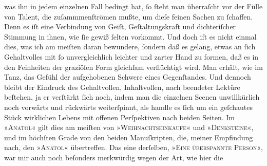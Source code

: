 \begin{ledgroupsized}[t]{13cm}
                    was ihn in jedem einzelnen Fall bedingt hat, ſo ſteht man überraſcht vor der
                    Fülle von Talent, die zuſammmenſtrömen mußte, um dieſe feinen Sachen zu
                    ſchaffen. Denn es iſt eine Verbindung von Geiſt, Geſtaltungskraft und
                    dichteriſcher Stimmung in ihnen, wie ſie gewiß ſelten vorkommt. Und doch iſt es
                    nicht einmal dies, was ich am meiſten {\pb}daran bewundere, ſondern daß es gelang, etwas an ſich Gehaltvolles mit ſo
                    unvergleichlich leichter und zarter Hand zu formen, daß es in den Feinheiten der
                    graziöſen Form gleichſam verflüchtigt wird. Man erhält, wie im Tanz, das Gefühl
                    der aufgehobenen Schwere eines Gegenſtandes. Und dennoch bleibt der Eindruck des
                    Gehaltvollen, Inhaltvollen, nach beendeter Lektüre beſtehen, ja er verſtärkt
                    ſich noch, indem man die einzelnen Scenen unwillkürlich noch vorwärts und
                    rückwärts weiterſpinnt, als handle es ſich um ein geſchautes Stück wirklichen
                    Lebens mit offenen Perſpektiven nach beiden Seiten. Im »\textsc{Anatol}« gilt dies am meiſten von »\textsc{Weihnachtseinkäufe}« und »\textsc{Denksteine}«, und im höchſten Grade von den beiden Manuſkripten, die, meiner
                    Empfindung nach, den »\textsc{Anatol}« übertreffen. Das eine derſelben, »\textsc{Eine überspannte Person}«, war mir auch noch beſonders merkwürdig wegen der Art, wie hier die

\end{ledgroupsized}
